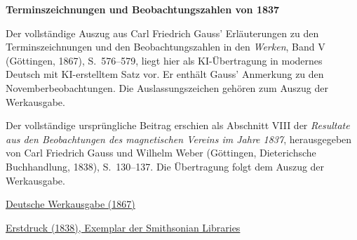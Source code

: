 \clearpage
\thispagestyle{empty}
\begin{center}\Large\textbf{Terminszeichnungen und Beobachtungszahlen von 1837}\end{center}

Der vollständige Auszug aus Carl Friedrich Gauss’ Erläuterungen zu den Terminszeichnungen und den Beobachtungszahlen in den \textit{Werken}, Band V (Göttingen, 1867), S.~576--579, liegt hier als KI-Übertragung in modernes Deutsch mit KI-erstelltem Satz vor. Er enthält Gauss’ Anmerkung zu den Novemberbeobachtungen. Die Auslassungszeichen gehören zum Auszug der Werkausgabe.

Der vollständige ursprüngliche Beitrag erschien als Abschnitt VIII der \textit{Resultate aus den Beobachtungen des magnetischen Vereins im Jahre 1837}, herausgegeben von Carl Friedrich Gauss und Wilhelm Weber (Göttingen, Dieterichsche Buchhandlung, 1838), S.~130--137. Die Übertragung folgt dem Auszug der Werkausgabe.

\medskip\noindent
\href{https://gdz.sub.uni-goettingen.de/id/PPN236006339}{Deutsche Werkausgabe (1867)}\par
\noindent\href{https://archive.org/details/ResultateausdenBd2Gaus/page/n137/mode/2up}{Erstdruck (1838), Exemplar der Smithsonian Libraries}
\clearpage
